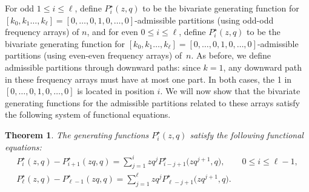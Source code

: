 \documentclass[pdftex]{sigma}
\numberwithin{equation}{section}
\newtheorem{Theorem}{Theorem}[section]
\theoremstyle{definition}
\begin{document}
For odd $1 \le i \le \ell$, define $P^\star_i(z,q)$ to be the bivariate generating function for $[k_0,k_1\dots,k_\ell]=[0,\dots,0,1,0,\dots,0]$-admissible partitions (using odd-odd frequency arrays) of $n$, and for even ${0 \le i \le \ell}$, define $P^\star_i(z,q)$ to be the bivariate generating function for $[k_0,k_1\dots,k_\ell]=[0,\dots,0,1,\allowbreak 0,\dots,0]$-admissible partitions (using even-even frequency arrays) of~$n$. As before, we define admissible partitions through downward paths: since $k=1$, any downward path in these frequency arrays must have at most one part. In both cases, the 1 in $[0,\dots,0,1,0,\dots,0]$ is located in position $i$. We will now show that the bivariate generating functions for the admissible partitions related to these arrays satisfy the following system of functional equations.
\begin{Theorem}\label{thm:funceq1B}
The generating functions $P^\star_i(z,q)$ satisfy the following functional equations:
\begin{gather*}
P^\star_i(z,q) - P^\star_{i+1}(zq,q) = \sum_{j=1}^i zq^j P^\star_{i-j+1}\bigl(zq^{j+1},q\bigr), \qquad 0 \le i \le \ell-1, \\
P^\star_\ell(z,q) - P^\star_{\ell-1}(zq,q) = \sum_{j=1}^\ell zq^j P^\star_{\ell-j+1}\bigl(zq^{j+1},q\bigr).
\end{gather*}
\end{Theorem}
\end{document}
